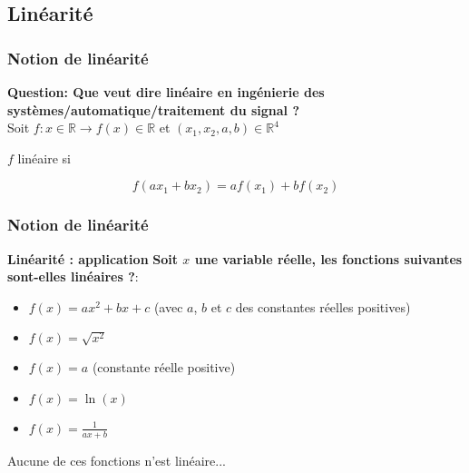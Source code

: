 \documentclass{beamer}
\begin{document}
\subsection{Linéarité}
\begin{frame}
\frametitle{Notion de linéarité}
\textbf{Question: Que veut dire linéaire en ingénierie des systèmes/automatique/traitement du signal ? \label{linéaire ?} }\\
\vspace{1 cm}
{
Soit $f : x \in \mathbb{R} \rightarrow f(x) \in \mathbb{R} $ et $(x_1,x_2,a,b) \in \mathbb{R}^4$
\\}
\vspace{1 cm}
{
$f$ linéaire si\\
\vspace{0.5 cm}

\[\boxed{f(a x_1 + b x_2) = a f(x_1) + b f(x_2)}\]

}

\end{frame}

\begin{frame}
\frametitle{Notion de linéarité}
 \textbf{Linéarité : application}
\textbf{Soit $x$ une variable réelle, les fonctions suivantes sont-elles linéaires ?}:
 \vspace{0.5cm}
\begin{itemize}
\item<2-> $f(x) = a x^2 + b x + c$ (avec $a$, $b$ et $c$ des constantes réelles positives)
\vspace{0.2cm}
\item<3-> $f(x) = \sqrt{x^2}$
\vspace{0.2cm}
\item<4-> $f(x) = a$ (constante réelle positive)
\vspace{0.2cm}
\item<5-> $f(x) = \ln(x)$
\vspace{0.2cm}
\item<6-> $f(x) = \frac{1}{a x + b}$
\end{itemize}
\vspace{1cm}
{
Aucune de ces fonctions n'est linéaire...
}
\end{frame}
\end{document}
